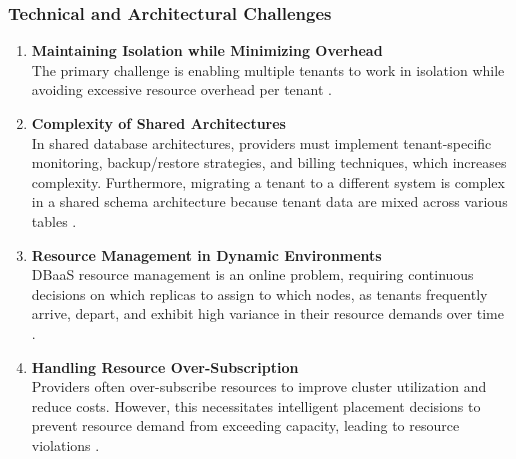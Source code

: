 \subsubsection{Technical and Architectural Challenges}
\begin{enumerate}[label=\alph*)]
    \item \textbf{Maintaining Isolation while Minimizing Overhead}\\
    The primary challenge is enabling multiple tenants to work in isolation while avoiding excessive resource overhead per tenant \cite{Comparison_of_dbaas_architectures}.

    \item \textbf{Complexity of Shared Architectures}\\
    In shared database architectures, providers must implement tenant-specific monitoring, backup/restore strategies, and billing techniques, which increases complexity. Furthermore, migrating a tenant to a different system is complex in a shared schema architecture because tenant data are mixed across various tables \cite{Comparison_of_dbaas_architectures}.

    \item \textbf{Resource Management in Dynamic Environments}\\
    DBaaS resource management is an online problem, requiring continuous decisions on which replicas to assign to which nodes, as tenants frequently arrive, depart, and exhibit high variance in their resource demands over time \cite{Solver_in_the_loop_cluster_resource_management_for_DBaaS}.

    \item \textbf{Handling Resource Over-Subscription}\\
    Providers often over-subscribe resources to improve cluster utilization and reduce costs. However, this necessitates intelligent placement decisions to prevent resource demand from exceeding capacity, leading to resource violations \cite{Solver_in_the_loop_cluster_resource_management_for_DBaaS}.
\end{enumerate}

